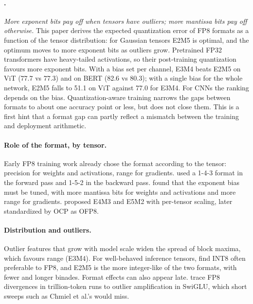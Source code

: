 \documentclass[11pt,letterpaper]{article}
\begin{document}
\paragraph{\citet{Kuzmin2022}.}
\emph{More exponent bits pay off when tensors have outliers; more mantissa bits pay off otherwise.} This paper derives the expected quantization error of FP8 formats as a function of the tensor distribution: for Gaussian tensors E2M5 is optimal, and the optimum moves to more exponent bits as outliers grow. Pretrained FP32 transformers have heavy-tailed activations, so their post-training quantization favours more exponent bits. With a bias set per channel, E3M4 beats E2M5 on ViT (77.7 vs 77.3) and on BERT (82.6 vs 80.3); with a single bias for the whole network, E2M5 falls to 51.1 on ViT against 77.0 for E3M4. For CNNs the ranking depends on the bias. Quantization-aware training narrows the gaps between formats to about one accuracy point or less, but does not close them. This is a first hint that a format gap can partly reflect a mismatch between the training and deployment arithmetic.

\paragraph{Role of the format, by tensor.}
Early FP8 training work already chose the format according to the tensor: precision for weights and activations, range for gradients. \citet{Sun2019} used a 1-4-3 format in the forward pass and 1-5-2 in the backward pass. \citet{Noune2022} found that the exponent bias must be tuned, with more mantissa bits for weights and activations and more range for gradients. \citet{Micikevicius2022} proposed E4M3 and E5M2 with per-tensor scaling, later standardized by OCP as OFP8.

\paragraph{Distribution and outliers.}
Outlier features that grow with model scale \citep{Dettmers2022} widen the spread of block maxima, which favours range (E3M4). For well-behaved inference tensors, \citet{vanBaalen2023} find INT8 often preferable to FP8, and E2M5 is the more integer-like of the two formats, with fewer and longer binades. Format effects can also appear late. \citet{Fishman2025} trace FP8 divergences in trillion-token runs to outlier amplification in SwiGLU, which short sweeps such as Chmiel et al.'s would miss.
\end{document}
